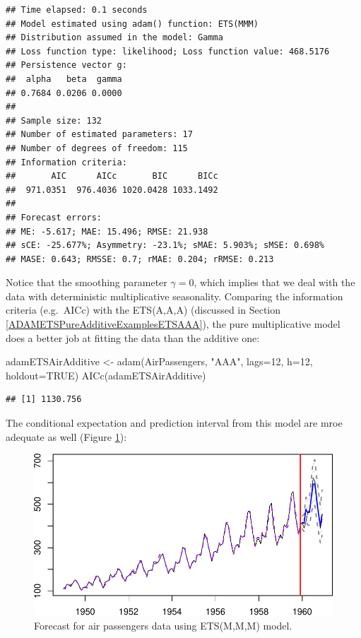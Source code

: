 \documentclass[
]{book}
\newenvironment{Shaded}{\begin{snugshade}}{\end{snugshade}}
\newcommand{\AttributeTok}[1]{\textcolor[rgb]{0.77,0.63,0.00}{#1}}
\newcommand{\ConstantTok}[1]{\textcolor[rgb]{0.00,0.00,0.00}{#1}}
\newcommand{\DecValTok}[1]{\textcolor[rgb]{0.00,0.00,0.81}{#1}}
\newcommand{\FunctionTok}[1]{\textcolor[rgb]{0.00,0.00,0.00}{#1}}
\newcommand{\NormalTok}[1]{#1}
\newcommand{\OtherTok}[1]{\textcolor[rgb]{0.56,0.35,0.01}{#1}}
\newcommand{\StringTok}[1]{\textcolor[rgb]{0.31,0.60,0.02}{#1}}
\theoremstyle{definition}
\theoremstyle{definition}
\theoremstyle{definition}
\theoremstyle{definition}
\theoremstyle{remark}
\begin{document}
\begin{verbatim}
## Time elapsed: 0.1 seconds
## Model estimated using adam() function: ETS(MMM)
## Distribution assumed in the model: Gamma
## Loss function type: likelihood; Loss function value: 468.5176
## Persistence vector g:
##  alpha   beta  gamma 
## 0.7684 0.0206 0.0000 
## 
## Sample size: 132
## Number of estimated parameters: 17
## Number of degrees of freedom: 115
## Information criteria:
##       AIC      AICc       BIC      BICc 
##  971.0351  976.4036 1020.0428 1033.1492 
## 
## Forecast errors:
## ME: -5.617; MAE: 15.496; RMSE: 21.938
## sCE: -25.677%; Asymmetry: -23.1%; sMAE: 5.903%; sMSE: 0.698%
## MASE: 0.643; RMSSE: 0.7; rMAE: 0.204; rRMSE: 0.213
\end{verbatim}

Notice that the smoothing parameter \(\gamma=0\), which implies that we deal with the data with deterministic multiplicative seasonality. Comparing the information criteria (e.g.~AICc) with the ETS(A,A,A) (discussed in Section \ref{ADAMETSPureAdditiveExamplesETSAAA}), the pure multiplicative model does a better job at fitting the data than the additive one:

\begin{Shaded}
\begin{Highlighting}[]
\NormalTok{adamETSAirAdditive }\OtherTok{\textless{}{-}} \FunctionTok{adam}\NormalTok{(AirPassengers, }\StringTok{"AAA"}\NormalTok{, }\AttributeTok{lags=}\DecValTok{12}\NormalTok{,}
                           \AttributeTok{h=}\DecValTok{12}\NormalTok{, }\AttributeTok{holdout=}\ConstantTok{TRUE}\NormalTok{)}
\FunctionTok{AICc}\NormalTok{(adamETSAirAdditive)}
\end{Highlighting}
\end{Shaded}

\begin{verbatim}
## [1] 1130.756
\end{verbatim}

The conditional expectation and prediction interval from this model are mroe adequate as well (Figure \ref{fig:AirPassengersMMMForecast}):

\begin{figure}
\centering
\includegraphics{Svetunkov--2022----ADAM_files/figure-latex/AirPassengersMMMForecast-1.pdf}
\caption{\label{fig:AirPassengersMMMForecast}Forecast for air passengers data using ETS(M,M,M) model.}
\end{figure}
\end{document}
